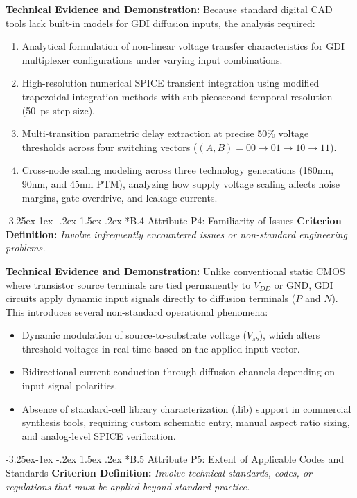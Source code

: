 \documentclass[12pt,a4paper,oneside]{report}
\makeatletter
\renewcommand\subsection{\@startsection{subsection}{2}{\z@}%
                                     {-3.25ex\@plus -1ex \@minus -.2ex}%
                                     {1.5ex \@plus .2ex}%
                                     {\normalfont\normalsize\bfseries\itshape}}
\makeatother
\begin{document}
\noindent\textbf{Technical Evidence and Demonstration:}
Because standard digital CAD tools lack built-in models for GDI diffusion inputs, the analysis required:
\begin{enumerate}
\item Analytical formulation of non-linear voltage transfer characteristics for GDI multiplexer configurations under varying input combinations.
\item High-resolution numerical SPICE transient integration using modified trapezoidal integration methods with sub-picosecond temporal resolution (50~ps step size).
\item Multi-transition parametric delay extraction at precise 50\% voltage thresholds across four switching vectors ($(A,B) = 00 \rightarrow 01 \rightarrow 10 \rightarrow 11$).
\item Cross-node scaling modeling across three technology generations (180nm, 90nm, and 45nm PTM), analyzing how supply voltage scaling affects noise margins, gate overdrive, and leakage currents.
\end{enumerate}

\subsection*{B.4 Attribute P4: Familiarity of Issues}
\textbf{Criterion Definition:} \textit{Involve infrequently encountered issues or non-standard engineering problems.}

\noindent\textbf{Technical Evidence and Demonstration:}
Unlike conventional static CMOS where transistor source terminals are tied permanently to $V_{DD}$ or GND, GDI circuits apply dynamic input signals directly to diffusion terminals ($P$ and $N$). This introduces several non-standard operational phenomena:
\begin{itemize}
\item Dynamic modulation of source-to-substrate voltage ($V_{sb}$), which alters threshold voltages in real time based on the applied input vector.
\item Bidirectional current conduction through diffusion channels depending on input signal polarities.
\item Absence of standard-cell library characterization (.lib) support in commercial synthesis tools, requiring custom schematic entry, manual aspect ratio sizing, and analog-level SPICE verification.
\end{itemize}

\subsection*{B.5 Attribute P5: Extent of Applicable Codes and Standards}
\textbf{Criterion Definition:} \textit{Involve technical standards, codes, or regulations that must be applied beyond standard practice.}
\end{document}
